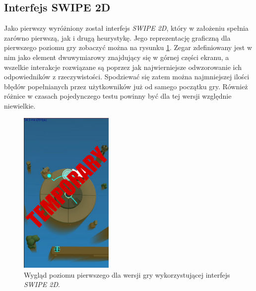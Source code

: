 \documentclass[a4paper,12pt,numbers=noenddot]{report}
\begin{document}
\subsection{Interfejs SWIPE 2D}
Jako pierwszy wyróżniony został interfejs \textit{SWIPE 2D}, który w założeniu spełnia zarówno pierwszą, jak i drugą heurystykę. Jego reprezentację graficzną dla pierwszego poziomu gry zobaczyć można na rysunku \ref{fig:interface_swipe_2d}. Zegar zdefiniowany jest w nim jako element dwuwymiarowy znajdujący się w górnej części ekranu, a wszelkie interakcje rozwiązane są poprzez jak najwierniejsze odwzorowanie ich odpowiedników z rzeczywistości. Spodziewać się zatem można najmniejszej ilości błędów popełnianych przez użytkowników już od samego początku gry. Również różnice w czasach pojedynczego testu powinny być dla tej wersji względnie niewielkie.
\begin{figure}[h!]
	\centering
  	\includegraphics[height=8cm]{fig/tmp.jpg}
	\caption{Wygląd poziomu pierwszego dla wersji gry wykorzystującej interfejs \textit{SWIPE 2D}.}
	\label{fig:interface_swipe_2d}
\end{figure}
\end{document}

